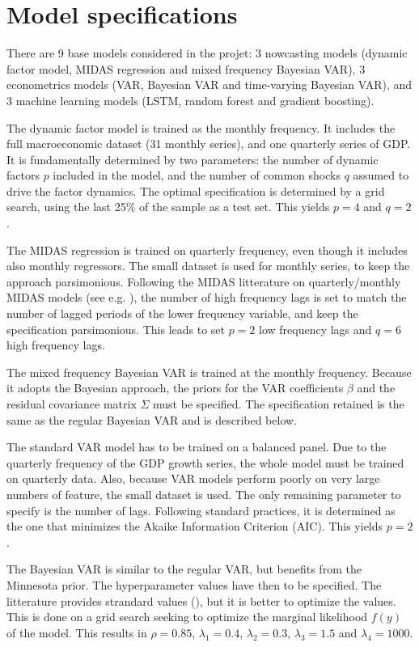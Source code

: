 \section{Model specifications}
\label{chapter4_section2}


There are 9 base models considered in the projet: 3 nowcasting models (dynamic factor model, MIDAS regression and mixed frequency Bayesian VAR), 3 econometrics models (VAR, Bayesian VAR and time-varying Bayesian VAR), and 3 machine learning models (LSTM, random forest and gradient boosting).

The dynamic factor model is trained as the monthly frequency. It includes the full macroeconomic dataset (31 monthly series), and one quarterly series of GDP. It is fundamentally determined by two parameters: the number of dynamic factors $p$ included in the model, and the number of common shocks $q$ assumed to drive the factor dynamics. The optimal specification is determined by a grid search, using the last 25\% of the sample as a test set. This yields $p = 4$ and $q = 2$.

The MIDAS regression is trained on quarterly frequency, even though it includes also monthly regressors. The small dataset is used for monthly series, to keep the approach parsimonious. Following the MIDAS litterature on quarterly/monthly MIDAS models (see e.g. \cite{Ghysels2016}), the number of high frequency lags is set to match the number of lagged periods of the lower frequency variable, and keep the specification parsimonious. This leads to set $p=2$ low frequency lags and $q=6$ high frequency lags.

The mixed frequency Bayesian VAR is trained at the monthly frequency. Because it adopts the Bayesian approach, the priors for the VAR coefficients $\beta$ and the residual covariance matrix $\Sigma$ must be specified. The specification retained is the same as the regular Bayesian VAR and is described below.

The standard VAR model has to be trained on a balanced panel. Due to the quarterly frequency of the GDP growth series, the whole model must be trained on quarterly data. Also, because VAR models perform poorly on very large numbers of feature, the small dataset is used. The only remaining parameter to specify is the number of lags. Following standard practices, it is determined as the one that minimizes the Akaike Information Criterion (AIC). This yields $p=2$.

The Bayesian VAR is similar to the regular VAR, but benefits from the Minnesota prior. The hyperparameter values have then to be specified. The litterature provides strandard values (\cite{Litterman1986}), but it is better to optimize the values. This is done on a grid search seeking to optimize the marginal likelihood $f(y)$ of the model. This results in $\rho = 0.85$, $\lambda_1 = 0.4$, $\lambda_2 = 0.3$, $\lambda_3 = 1.5$ and $\lambda_4 = 1000$.
 
